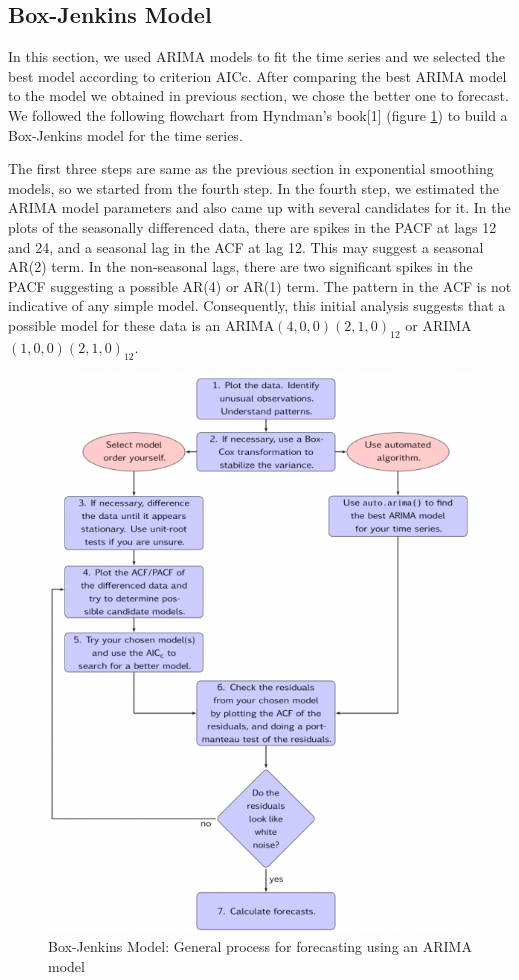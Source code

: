 \documentclass[journal, a4paper]{IEEEtran}
\begin{document}
\subsection{Box-Jenkins Model}
In this section, we used ARIMA models to fit the time series and we selected the best model according to criterion AICc. After comparing the best ARIMA model to the model we obtained in previous section, we chose the better one to forecast.
We followed the following flowchart from Hyndman's book[1] (figure \ref{fig1:flowchart}) to build a Box-Jenkins model for the time series. 

The first three steps are same as the previous section in exponential smoothing models, so we started from the fourth step. In the fourth step, we estimated the ARIMA model parameters and also came up with several candidates for it. In the plots of the seasonally differenced data, there are spikes in the PACF at lags 12 and 24, and a seasonal lag in the ACF at lag 12. This may suggest a seasonal AR(2) term. In the non-seasonal lags, there are two significant spikes in the PACF suggesting a possible AR(4) or AR(1) term. The pattern in the ACF is not indicative of any simple model. Consequently, this initial analysis suggests that a possible model for these data is an ARIMA$(4,0,0)(2,1,0)_{12}$ or ARIMA$(1,0,0)(2,1,0)_{12}$.
\begin{figure}[H]
\begin{center}
\includegraphics[scale=0.4]{fig1/flowchart.png}
\caption{Box-Jenkins Model: General process for forecasting using an ARIMA model}
\label{fig1:flowchart}
\end{center}
\end{figure}
\end{document}
